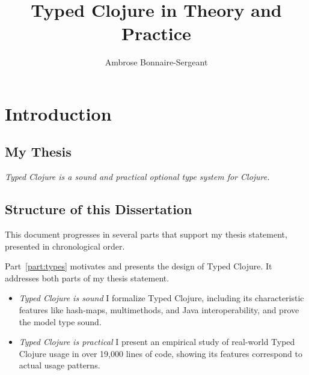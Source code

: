 \documentclass[11pt]{iuthesis}
\newcommand{\thesisauthor}[0]{Ambrose Bonnaire-Sergeant}
\newcommand{\thesistitle}[0]{Typed Clojure in Theory and Practice}
\begin{document}
\frontmatter %
\title{\thesistitle{}}
\author{\thesisauthor{}}




\maketitle
\signaturepage
\copyrightpage



\singlespacing
\tableofcontents


\doublespacing

\newpage

\mainmatter

%

\chapter{Introduction}

\section{My Thesis}

\emph{Typed Clojure is a sound and practical optional type system for Clojure.}

\section{Structure of this Dissertation}

This document progresses in several parts that support my thesis statement, presented in chronological order.

Part~\ref{part:types} motivates and presents the design of Typed Clojure.
It addresses both parts of my thesis statement.

\begin{itemize}
  \item \emph{Typed Clojure is sound} I formalize Typed Clojure, including
    its characteristic features like hash-maps, multimethods, and Java interoperability,
    and prove the model type sound.
  \item \emph{Typed Clojure is practical} 
      I present an empirical study of real-world Typed Clojure usage
        in over 19,000 lines of code, showing its features correspond to actual usage patterns.
\end{itemize}
\end{document}
